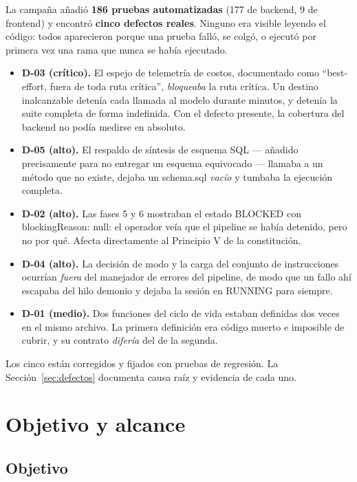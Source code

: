 \documentclass[11pt,a4paper]{article}
\newcommand{\code}[1]{{\ttfamily\small\def\_{\textunderscore\allowbreak}#1}}
\begin{document}
\noindent
La campaña añadió \textbf{186 pruebas automatizadas} (177 de backend, 9 de frontend) y
encontró \textbf{cinco defectos reales}. Ninguno era visible leyendo el código: todos
aparecieron porque una prueba falló, se colgó, o ejecutó por primera vez una rama que nunca
se había ejecutado.

\begin{itemize}[leftmargin=1.4em]
\item \textbf{D-03 (crítico).} El espejo de telemetría de costos, documentado como
      ``best-effort, fuera de toda ruta crítica'', \emph{bloqueaba} la ruta crítica. Un
      destino inalcanzable detenía cada llamada al modelo durante minutos, y detenía la
      suite completa de forma indefinida. Con el defecto presente, la cobertura del backend
      no podía medirse en absoluto.
\item \textbf{D-05 (alto).} El respaldo de síntesis de esquema SQL --- añadido precisamente
      para no entregar un esquema equivocado --- llamaba a un método que no existe, dejaba un
      \code{schema.sql} \emph{vacío} y tumbaba la ejecución completa.
\item \textbf{D-02 (alto).} Las fases 5 y 6 mostraban el estado \code{BLOCKED} con
      \code{blockingReason: null}: el operador veía que el pipeline se había detenido, pero
      no por qué. Afecta directamente al Principio V de la constitución.
\item \textbf{D-04 (alto).} La decisión de modo y la carga del conjunto de instrucciones
      ocurrían \emph{fuera} del manejador de errores del pipeline, de modo que un fallo ahí
      escapaba del hilo demonio y dejaba la sesión en \code{RUNNING} para siempre.
\item \textbf{D-01 (medio).} Dos funciones del ciclo de vida estaban definidas dos veces en
      el mismo archivo. La primera definición era código muerto e imposible de cubrir, y su
      contrato \emph{difería} del de la segunda.
\end{itemize}

\noindent
Los cinco están corregidos y fijados con pruebas de regresión. La Sección~\ref{sec:defectos}
documenta causa raíz y evidencia de cada uno.

\section{Objetivo y alcance}

\subsection{Objetivo}
\end{document}
